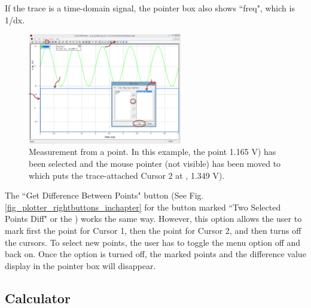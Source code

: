 If the trace is a time-domain signal, the pointer box also shows ``\textsf{freq}", which is 1/\textsf{dx}.

\begin{figure}
    \includegraphics[width=0.6\textwidth]{./figures/plotter_netlist_editor_figures/Plotter_AddingTraces_MultiPane.png} %
    \caption{{Measurement from a point.  In this example, the point  1.165 V) has been selected and the mouse pointer (not visible) has been moved to  which puts the trace-attached Cursor 2 at , 1.349 V).   }}
  \label{fig_plotter_distancefrompoint}
\end{figure}

The ``\textsf{Get Difference Between Points}" button (See Fig. \ref{fig_plotter_rightbuttons_inchapter} for the button marked ``Two Selected Points Diff" or the ) works the same way. However, this option allows the user to mark first the point for Cursor 1, then the point for Cursor 2, and then turns off the cursors.  To select new points, the user has to toggle the menu option off and back on.  Once the option is turned off, the marked points and the difference value display in the pointer box will disappear.

\subsection{Calculator}
\label{subsec_pane_calculator}

